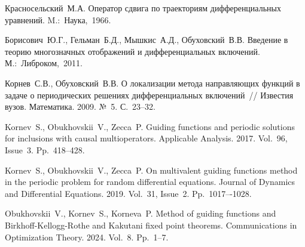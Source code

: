 \begin{thebibliography}{9} %

 Красносельский~М.А. Оператор сдвига по траекториям дифференциальных уравнений. M.:~Наука,~1966.

 Борисович~Ю.Г., Гельман~Б.Д., Мышкис~А.Д., Обуховский~В.В. Введение в теорию многозначных отображений и дифференциальных включений. М.:~Либроком,~2011.

 Корнев~С.В., Обуховский~В.В. О локализации метода направляющих функций в задаче о периодических решениях дифференциальных включений~// Известия вузов. Математика. 2009. №~5. С.~23--32.

 Kornev~S., Obukhovskii~V., Zecca~P. Guiding functions and periodic solutions for inclusions with causal multioperators. Applicable Analysis. 2017. Vol.~96, Issue~3. Pp.~418--428.

 Kornev~S., Obukhovskii~V., Zecca~P. On multivalent guiding functions method in the periodic problem for random differential equations. Journal of Dynamics and Differential Equations. 2019. Vol.~31, Issue~2. Pp.~1017–-1028.

   Obukhovskii~V., Kornev~S., Korneva~P. Method of guiding functions and Birkhoff-Kellogg-Rothe and Kakutani fixed point theorems. Communications in Optimization Theory. 2024. Vol.~8. Pp.~1--7.

\end{thebibliography}





%
